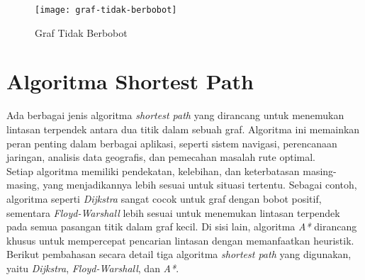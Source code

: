 \begin{figure}[H] 
    \centering  
    \texttt{[image: graf-tidak-berbobot]}  
    \caption{Graf Tidak Berbobot}
    \label{fig:graftidakberbobot} 
\end{figure}

\section{Algoritma Shortest Path}
\label{sec:algoritmasp}
Ada berbagai jenis algoritma \textit{shortest path} yang dirancang untuk menemukan lintasan terpendek antara dua titik dalam sebuah graf. Algoritma ini memainkan peran penting dalam berbagai aplikasi, seperti sistem navigasi, perencanaan jaringan, analisis data geografis, dan pemecahan masalah rute optimal.
\\
Setiap algoritma memiliki pendekatan, kelebihan, dan keterbatasan masing-masing, yang menjadikannya lebih sesuai untuk situasi tertentu. Sebagai contoh, algoritma seperti \textit{Dijkstra} sangat cocok untuk graf dengan bobot positif, sementara \textit{Floyd-Warshall} lebih sesuai untuk menemukan lintasan terpendek pada semua pasangan titik dalam graf kecil. Di sisi lain, algoritma \textit{A*} dirancang khusus untuk mempercepat pencarian lintasan dengan memanfaatkan heuristik. Berikut pembahasan secara detail tiga algoritma \textit{shortest path} yang digunakan, yaitu \textit{Dijkstra}, \textit{Floyd-Warshall}, dan \textit{A*}.
\newpage
